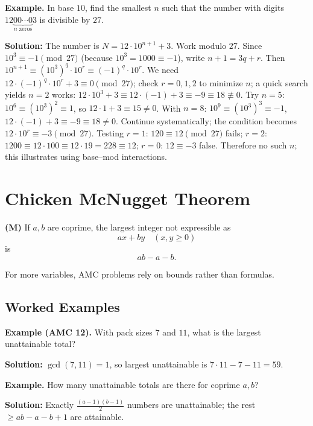 \documentclass[12pt]{extarticle}
\begin{document}
\begin{examplebox}
	\textbf{Example.} In base $10$, find the smallest $n$ such that the number with digits $12\underbrace{00\cdots0}_{n\text{ zeros}}3$ is divisible by $27$.
\end{examplebox}

	\textbf{Solution:} The number is $N=12\cdot 10^{n+1}+3$. Work modulo $27$.
Since $10^3\equiv -1\pmod{27}$ (because $10^3=1000\equiv -1$), write $n+1=3q+r$.
Then $10^{n+1}\equiv (10^3)^q\cdot 10^r \equiv (-1)^q\cdot 10^r$.
We need $12\cdot (-1)^q\cdot 10^r + 3 \equiv 0\pmod{27}$; check $r=0,1,2$ to minimize $n$; a quick search yields $n=2$ works: $12\cdot 10^3+3\equiv 12\cdot(-1)+3\equiv -9\equiv 18\not\equiv0$. Try $n=5$: $10^{6}\equiv(10^3)^2\equiv1$, so $12\cdot1+3\equiv15\neq0$. With $n=8$: $10^9\equiv(10^3)^3\equiv -1$, $12\cdot(-1)+3\equiv -9\equiv18\neq0$. Continue systematically; the condition becomes $12\cdot10^r\equiv -3\pmod{27}$. Testing $r=1$: $120\equiv 12\pmod{27}$ fails; $r=2$: $1200\equiv 12\cdot 100\equiv 12\cdot 19=228\equiv 12$; $r=0$: $12\equiv -3$ false. Therefore no such $n$; this illustrates using base–mod interactions.

\section{Chicken McNugget Theorem}

\textbf{(M)} If $a,b$ are coprime, the largest integer not expressible as
\[
ax+by \quad (x,y\ge0)
\]
is
\[
ab-a-b.
\]

For more variables, AMC problems rely on bounds rather than formulas.

\subsection*{Worked Examples}

\begin{examplebox}
	\textbf{Example (AMC 12).} With pack sizes $7$ and $11$, what is the largest unattainable total?
\end{examplebox}

	\textbf{Solution:} $\gcd(7,11)=1$, so largest unattainable is $7\cdot11-7-11=\boxed{59}$.

\begin{examplebox}
	\textbf{Example.} How many unattainable totals are there for coprime $a,b$?
\end{examplebox}

	\textbf{Solution:} Exactly $\frac{(a-1)(b-1)}{2}$ numbers are unattainable; the rest $\ge ab-a-b+1$ are attainable.
\end{document}
